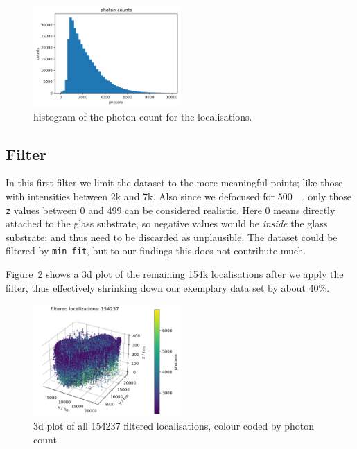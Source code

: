 \documentclass[11pt, a4paper, oneside, twocolumn]{report}
\renewcommand{\tt}{\texttt}
\newcommand{\e}{\emph}
\newcommand{\m}{\mathrm}
\begin{document}
\begin{figure}[h!]
  \centering
  \includegraphics[width=0.5\textwidth]{3_photons.png}
  \caption{histogram of the photon count for the localisations.}
  \label{f:3_photons}
\end{figure}


\subsection{Filter}

In this first filter we limit the dataset to the more meaningful
points; like those with intensities between 2k and 7k. Also since we
defocused for \SI{500}{\nano\m}, only those \tt{z} values between 0 and
499 can be considered realistic. Here 0 means directly attached to the
glass substrate, so negative values would be \e{inside} the glass
substrate; and thus need to be discarded as unplausible. The dataset
could be filtered by \tt{min\_fit}, but to our findings this does not
contribute much.

Figure~\ref{f:4_filter} shows a 3d plot of the remaining 154k
localisations after we apply the filter, thus effectively shrinking
down our exemplary data set by about 40\%.

\begin{figure}[h!]
  \centering
  \includegraphics[width=0.5\textwidth]{4_filter.png}
  \caption{3d plot of all 154237 filtered localisations, colour coded
    by photon count.}
  \label{f:4_filter}
\end{figure}
\end{document}
